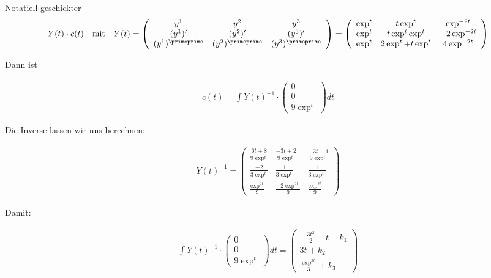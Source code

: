 \begin{solution}
Notatiell geschickter
\begin{align*}
  Y(t) \cdot c(t) \quad \text{mit} \quad
  Y(t) = \left(
  \begin{array}{ccc}
    y^1 & y^2 & y^3 \\
    (y^1)^\prime & (y^2)^\prime & (y^3)^\prime \\
    (y^1)^\primeprime & (y^2)^\primeprime & (y^3)^\primeprime
  \end{array}
  \right)  =
  \left(
  \begin{array}{ccc}
    \exp^t & t\exp^t & \exp^{-2t} \\
    \exp^t & t\exp^t \exp^t & -2\exp^{-2t} \\
    \exp^t & 2\exp^t + t\exp^t & 4\exp^{-2t}
  \end{array}
  \right)
\end{align*}

Dann ist

\begin{align*}
  c(t) = \int Y(t)^{-1} \cdot
  \left(
  \begin{array}{c}
    0 \\
    0 \\
    9\exp^t
  \end{array}
  \right) dt
\end{align*}

Die Inverse lassen wir uns berechnen:

\begin{align*}
  Y(t)^{-1} = \left(
  \begin{array}{ccc}
    \frac{6t+8}{9\exp^t} & \frac{-3t+2}{9\exp^t} & \frac{-3t-1}{9\exp^t} \\
    \frac{-2}{3\exp^t} & \frac{1}{3\exp^t} & \frac{1}{3\exp^t} \\
    \frac{\exp^{2t}}{9} & \frac{-2\exp^{2t}}{9} & \frac{\exp^{2t}}{9}
  \end{array}
  \right)
\end{align*}

Damit:

\begin{align*}
  \int Y(t)^{-1} \cdot
  \left(
  \begin{array}{c}
    0 \\
    0 \\
    9\exp^t
  \end{array}
  \right)dt = \left(
  \begin{array}{c}
    -\frac{3t^2}{2} - t + k_1 \\
    3t + k_2 \\
    \frac{\exp^{3t}}{3} + k_3
  \end{array}
  \right)
\end{align*}


\end{solution}
